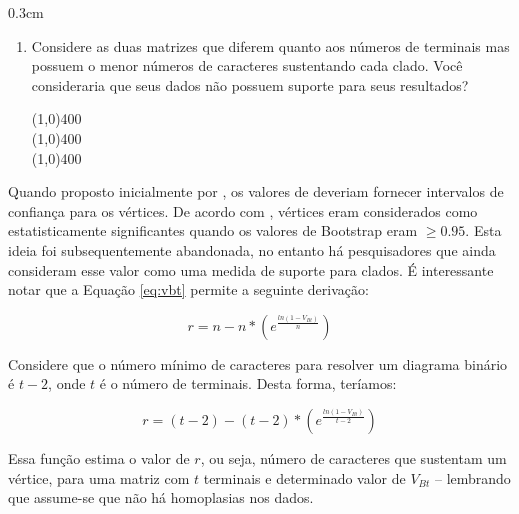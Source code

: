 \begin{refsection}
\begin {myindentpar}{0.3cm}
\begin{enumerate}[\itshape 1.]
\begin{center}
\line(1,0){400}\\
\line(1,0){400}\\
\line(1,0){400}\\
\end{center}


	\item{Considere as duas matrizes que diferem quanto aos números de terminais mas possuem o menor números de caracteres sustentando cada clado. Você consideraria que seus dados não possuem suporte para seus resultados?}


\begin{center}
\line(1,0){400}\\
\line(1,0){400}\\
\line(1,0){400}\\
\end{center}


\end{enumerate}
\end{myindentpar}

Quando proposto inicialmente por \textcite{Felsenstein1985}, os valores de deveriam fornecer intervalos de confiança para os vértices. De acordo com \textcite{Felsenstein1985}, vértices eram considerados como estatisticamente significantes quando os valores de Bootstrap eram $\geq 0.95$. Esta ideia foi subsequentemente abandonada, no entanto há pesquisadores que ainda consideram esse valor como uma medida de suporte para clados. É interessante notar que a Equação \ref{eq:vbt} permite a seguinte derivação:

\begin{center}
\begin{equation}\label{eq:r}
r = n - n * (e^\frac{ln(1-V_{Bt})}{n})
\end{equation}
\end{center}


Considere que o número mínimo de caracteres para resolver um diagrama binário é $t-2$, onde $t$ é o número de terminais. Desta forma, teríamos:

\begin{center}
\begin{equation}\label{eq:t}
r = (t-2) - (t-2) * (e^\frac{ln(1-V_{Bt})}{t-2})
\end{equation}
\end{center}

Essa função estima o valor de $r$, ou seja, número de caracteres que sustentam um vértice, para uma matriz com $t$ terminais e determinado valor de $V_{Bt}$ -- lembrando que assume-se que não há homoplasias nos dados.\\



\end{refsection}
